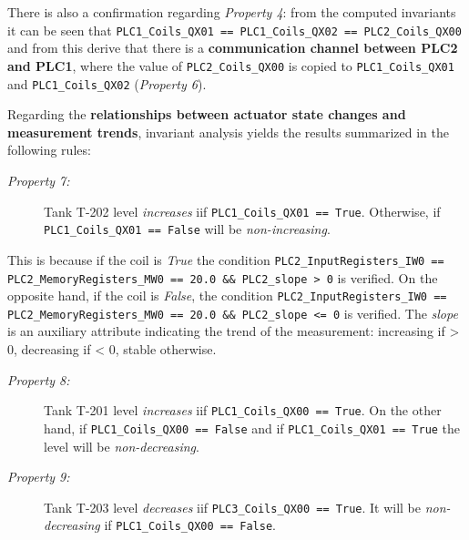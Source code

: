 \bigskip
There is also a confirmation regarding \textit{Property 4}: from the computed invariants it can be seen that \newline \newline
\small\texttt{PLC1\_Coils\_QX01 == PLC1\_Coils\_QX02 == PLC2\_Coils\_QX00}\newline \newline
\normalsize and from this derive that there is a \textbf{communication channel between PLC2 and PLC1}, where the value of \texttt{PLC2\_Coils\_QX00} is copied to \texttt{PLC1\_Coils\_QX01} and \texttt{PLC1\_Coils\_QX02} (\textit{Property 6}).

\bigskip
Regarding the \textbf{relationships between actuator state changes and measurement trends}, invariant analysis yields the results summarized in the following rules:

\begin{description}
	\item[\colorbox{backcolourtext}{\normalfont\textit{Property 7:}}] Tank T-202 level \textit{increases} iif \texttt{PLC1\_Coils\_QX01 == True}. Otherwise, if \texttt{PLC1\_Coils\_QX01 == False} will be \textit{non-increasing}.
\end{description}
	This is because if the coil is \textit{True} the condition \newline \scriptsize\texttt{PLC2\_InputRegisters\_IW0 == PLC2\_MemoryRegisters\_MW0 == 20.0 \&\& PLC2\_slope > 0} \newline \normalsize is verified. 
	On the opposite hand, if the coil is \textit{False}, the condition \newline \scriptsize\texttt{PLC2\_InputRegisters\_IW0 == PLC2\_MemoryRegisters\_MW0 == 20.0 \&\& PLC2\_slope <= 0}  \normalsize is verified. The \textit{slope} is an auxiliary attribute indicating the trend of the measurement: increasing if > 0, decreasing if < 0, stable otherwise.

\begin{description}
	\item[\colorbox{backcolourtext}{\normalfont\textit{Property 8:}}] Tank T-201 level \textit{increases} iif \texttt{PLC1\_Coils\_QX00 == True}. On the other hand, if \texttt{PLC1\_Coils\_QX00 == False} and if \texttt{PLC1\_Coils\_QX01 == True} the level will be \textit{non-decreasing}.
	
	\item[\colorbox{backcolourtext}{\normalfont\textit{Property 9:}}] Tank T-203 level \textit{decreases} iif \texttt{PLC3\_Coils\_QX00 == True}. It will be \textit{non-decreasing} if \texttt{PLC1\_Coils\_QX00 == False}.
\end{description}

